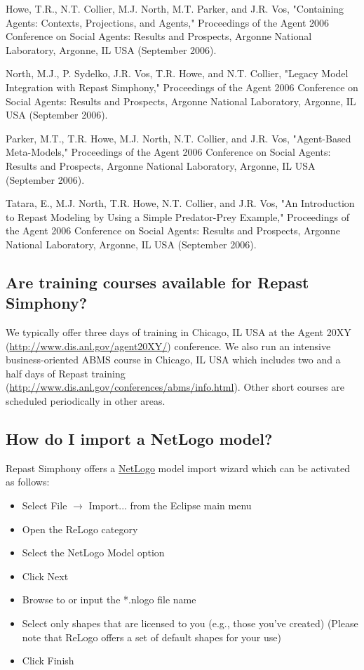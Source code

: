 \documentclass[11pt]{article}
\begin{document}
Howe, T.R., N.T. Collier, M.J. North, M.T. Parker, and J.R. Vos, "Containing Agents: Contexts, Projections, and Agents," Proceedings of the Agent 2006 Conference on Social Agents: Results and Prospects, Argonne National Laboratory, Argonne, IL USA (September 2006).

North, M.J., P. Sydelko, J.R. Vos, T.R. Howe, and N.T. Collier, "Legacy Model Integration with Repast Simphony," Proceedings of the Agent 2006 Conference on Social Agents: Results and Prospects, Argonne National Laboratory, Argonne, IL USA (September 2006).

Parker, M.T., T.R. Howe, M.J. North, N.T. Collier, and J.R. Vos, "Agent-Based Meta-Models," Proceedings of the Agent 2006 Conference on Social Agents: Results and Prospects, Argonne National Laboratory, Argonne, IL USA (September 2006).

Tatara, E., M.J. North, T.R. Howe, N.T. Collier, and J.R. Vos, "An Introduction to Repast Modeling by Using a Simple Predator-Prey Example," Proceedings of the Agent 2006 Conference on Social Agents: Results and Prospects, Argonne National Laboratory, Argonne, IL USA (September 2006).

\subsection{Are training courses available for Repast Simphony?}
\label{gq:training}
We typically offer three days of training in Chicago, IL USA at the Agent 20XY (\url{http://www.dis.anl.gov/agent20XY/}) conference. We also run an intensive business-oriented ABMS course in Chicago, IL USA which includes two and a half days of Repast training (\url{http://www.dis.anl.gov/conferences/abms/info.html}). Other short courses are scheduled periodically in other areas.

\subsection{How do I import a NetLogo model?}
\label{gq:nl_import}
Repast Simphony offers a \href{http://ccl.northwestern.edu/netlogo/}{NetLogo} model import wizard which can be activated as follows:
\begin{itemize}
\item Select File $\rightarrow$ Import... from the Eclipse main menu
\item Open the ReLogo category
\item Select the NetLogo Model option
\item Click Next
\item Browse to or input the *.nlogo file name
\item Select only shapes that are licensed to you (e.g., those you've created) (Please note that ReLogo offers a set of default shapes for your use)
\item Click Finish
\end{itemize}
\end{document}
